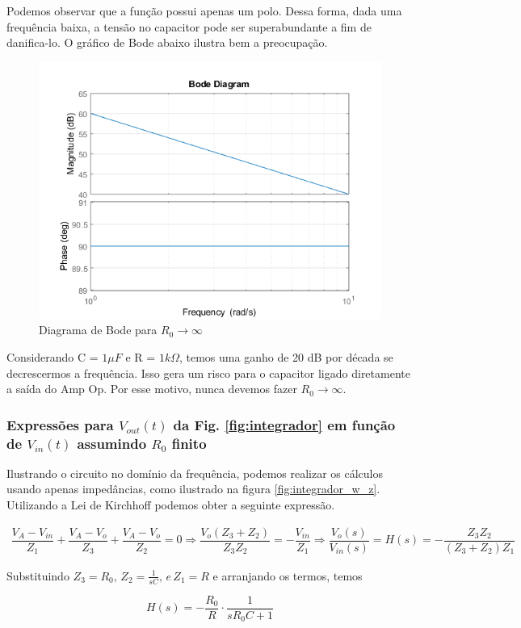 Podemos observar que a função possui apenas um polo. Dessa forma, dada uma frequência baixa, a tensão no capacitor pode ser superabundante a fim de danifica-lo. O gráfico de Bode abaixo ilustra bem a preocupação.

\begin{figure}[H]
	\centering
	\includegraphics[width=.4\textwidth]{imagens/bode_plot_fig2_2_infty.png}
	\caption{Diagrama de Bode para $R_0 \rightarrow \infty$ }
	\label{fig: bode_2.2_rinf}
\end{figure}


Considerando C = $1\mu F$ e R = $1k\Omega$, temos uma ganho de 20 dB por década se decrescermos a frequência. Isso gera um risco para o capacitor ligado diretamente a saída do Amp Op. Por esse motivo, nunca devemos fazer $R_0 \rightarrow \infty$.

\subsubsection{Expressões para $V_{out}(t)$ da Fig. \ref{fig:integrador} em função de $V_{in}(t)$ assumindo $R_0$ finito}

Ilustrando o circuito no domínio da frequência, podemos realizar os cálculos usando apenas impedâncias, como ilustrado na figura \ref{fig:integrador_w_z}. Utilizando a Lei de Kirchhoff podemos obter a seguinte expressão.

\begin{gather*}
	\dfrac{V_A - V_{in}}{Z_1} + \dfrac{V_A-V_o}{Z_3} + \dfrac{V_A - V_o}{Z_2} = 0
	\Longrightarrow \dfrac{V_o(Z_3+Z_2)}{Z_3Z_2} = -\dfrac{V_{in}}{Z_1}
	\Longrightarrow \dfrac{V_o (s)}{V_{in}(s)} = H(s) = -\dfrac{Z_3Z_2}{(Z_3 +  Z_2)Z_1}
\end{gather*}

Substituindo $Z_3 = R_0, \, Z_2 = \frac{1}{sC}, \, e \, Z_1 = R$ e arranjando os termos, temos

\begin{equation}
	H(s) = -\dfrac{R_0}{R} \cdot\dfrac{1}{sR_0C + 1}
\end{equation}

